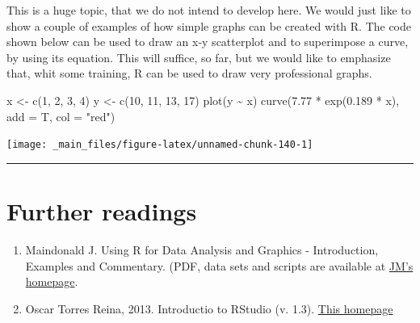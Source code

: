 \documentclass[a4paper,12pt,oneside]{book}
\providecommand{\tightlist}{%
  \setlength{\itemsep}{0pt}\setlength{\parskip}{0pt}}
\newenvironment{Shaded}{\begin{snugshade}}{\end{snugshade}}
\newcommand{\DecValTok}[1]{#1}
\newcommand{\FloatTok}[1]{#1}
\newcommand{\SpecialCharTok}[1]{#1}
\newcommand{\StringTok}[1]{#1}
\newcommand{\OtherTok}[1]{#1}
\newcommand{\FunctionTok}[1]{#1}
\newcommand{\AttributeTok}[1]{#1}
\newcommand{\NormalTok}[1]{#1}
\begin{document}
This is a huge topic, that we do not intend to develop here. We would just like to show a couple of examples of how simple graphs can be created with R. The code shown below can be used to draw an x-y scatterplot and to superimpose a curve, by using its equation. This will suffice, so far, but we would like to emphasize that, whit some training, R can be used to draw very professional graphs.

\begin{Shaded}
\begin{Highlighting}[]
\NormalTok{x  }\OtherTok{\textless{}{-}}  \FunctionTok{c}\NormalTok{(}\DecValTok{1}\NormalTok{, }\DecValTok{2}\NormalTok{, }\DecValTok{3}\NormalTok{, }\DecValTok{4}\NormalTok{)}
\NormalTok{y  }\OtherTok{\textless{}{-}}  \FunctionTok{c}\NormalTok{(}\DecValTok{10}\NormalTok{, }\DecValTok{11}\NormalTok{, }\DecValTok{13}\NormalTok{, }\DecValTok{17}\NormalTok{)}
\FunctionTok{plot}\NormalTok{(y }\SpecialCharTok{\textasciitilde{}}\NormalTok{ x)}
\FunctionTok{curve}\NormalTok{(}\FloatTok{7.77} \SpecialCharTok{*} \FunctionTok{exp}\NormalTok{(}\FloatTok{0.189} \SpecialCharTok{*}\NormalTok{ x), }\AttributeTok{add =}\NormalTok{ T, }\AttributeTok{col =} \StringTok{"red"}\NormalTok{)}
\end{Highlighting}
\end{Shaded}

\texttt{[image: \_main\_files/figure-latex/unnamed-chunk-140-1]}

\begin{center}\rule{0.5\linewidth}{0.5pt}\end{center}

\hypertarget{further-readings-8}{%
\section{Further readings}\label{further-readings-8}}

\begin{enumerate}
\def\labelenumi{\arabic{enumi}.}
\tightlist
\item
  Maindonald J. Using R for Data Analysis and Graphics - Introduction, Examples and Commentary. (PDF, data sets and scripts are available at \href{https://cran.r-project.org/doc/contrib/usingR.pdff}{JM's homepage}.
\item
  Oscar Torres Reina, 2013. Introductio to RStudio (v. 1.3). \href{https://dss.princeton.edu/training/RStudio101.pdf}{This homepage}
\end{enumerate}
\end{document}
